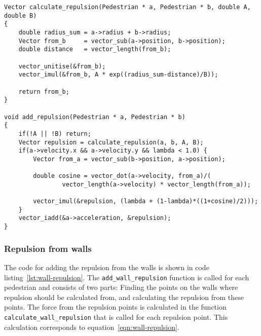 \begin{lstlisting}[caption={Calculating the repulsion from other 
    pedestrians.},label=lst:pedestrian-repulsion]
Vector calculate_repulsion(Pedestrian * a, Pedestrian * b, double A, double B)
{
    double radius_sum = a->radius + b->radius;
    Vector from_b     = vector_sub(a->position, b->position);
    double distance   = vector_length(from_b);

    vector_unitise(&from_b);
    vector_imul(&from_b, A * exp((radius_sum-distance)/B));

    return from_b;
}

void add_repulsion(Pedestrian * a, Pedestrian * b)
{
    if(!A || !B) return;
    Vector repulsion = calculate_repulsion(a, b, A, B);
	if(a->velocity.x && a->velocity.y && lambda < 1.0) {
		Vector from_a = vector_sub(b->position, a->position);

		double cosine = vector_dot(a->velocity, from_a)/(
				vector_length(a->velocity) * vector_length(from_a));

		vector_imul(&repulsion, (lambda + (1-lambda)*((1+cosine)/2)));
	}
    vector_iadd(&a->acceleration, &repulsion);
}
\end{lstlisting}

\subsubsection{Repulsion from walls}
The code for adding the repulsion from the walls is shown in code 
listing~\ref{lst:wall-repulsion}. The \texttt{add\_wall\_repulsion} function 
is called for each pedestrian and consists of two parts: Finding the points on the 
walls where repulsion should be calculated from, and calculating the repulsion 
from these points. The force from the repulsion points is calculated in the 
function \texttt{calculate\_wall\_repulsion} that is called for each repulsion 
point. This calculation corresponds to equation~\eqref{eqn:wall-repulsion}.

